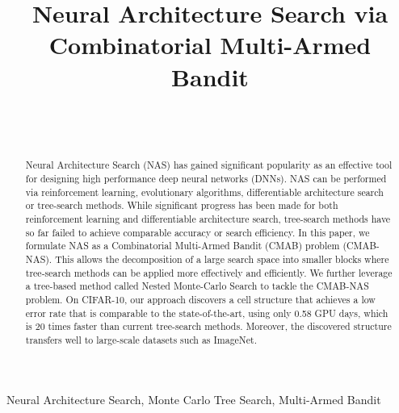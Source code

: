 \documentclass[conference]{IEEEtran}
\begin{document}
\title{Neural Architecture Search via Combinatorial Multi-Armed Bandit}

\author{
	\\
	\\
}

\maketitle

\begin{abstract}
Neural Architecture Search (NAS) has gained significant popularity as an effective tool for designing high performance deep neural networks (DNNs). 
NAS can be performed via reinforcement learning, evolutionary algorithms, differentiable architecture search or tree-search methods. 
While significant progress has been made for both reinforcement learning and differentiable architecture search, tree-search methods have so far failed to achieve comparable accuracy or search efficiency.
In this paper, we formulate NAS as a Combinatorial Multi-Armed Bandit (CMAB) problem (CMAB-NAS). This allows the decomposition of a large search space into smaller blocks where tree-search methods can be applied more effectively and efficiently.
We further leverage a tree-based method called Nested Monte-Carlo Search to tackle the CMAB-NAS problem.
On CIFAR-10, our approach discovers a cell structure that achieves a low error rate that is comparable to the state-of-the-art, using only 0.58 GPU days, which is 20 times faster than current tree-search methods. Moreover, the discovered structure transfers well to large-scale datasets such as ImageNet.
\end{abstract}


\begin{IEEEkeywords}
Neural Architecture Search, Monte Carlo Tree Search, Multi-Armed Bandit
\end{IEEEkeywords}
\end{document}
